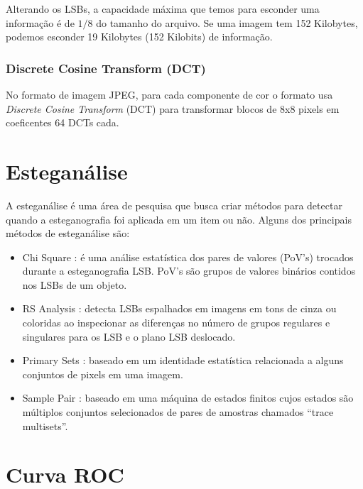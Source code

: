 Alterando os LSBs, a capacidade máxima que temos para esconder uma informação é de $1/8$ do tamanho do arquivo. Se uma imagem tem 152 Kilobytes, podemos esconder 19 Kilobytes (152 Kilobits) de informação.

\subsubsection{Discrete Cosine Transform (DCT)}

No formato de imagem JPEG, para cada componente de cor o formato usa \emph{Discrete Cosine Transform} (DCT) para transformar blocos de 8x8 pixels em coeficentes 64 DCTs cada. \cite{provos_hide_2003}


\section{Esteganálise}

A esteganálise é uma área de pesquisa que busca criar métodos para detectar quando a esteganografia foi aplicada em um item ou não. Alguns dos principais métodos de esteganálise são:

\begin{itemize}
\item Chi Square \cite{westfeld1999attacks}: é uma análise estatística dos pares de valores (PoV's) trocados durante a esteganografia LSB. PoV's são grupos de valores binários contidos nos LSBs de um objeto.
\item RS Analysis \cite{fridrich2001reliable}: detecta LSBs espalhados em imagens em tons de cinza ou coloridas ao inspecionar as diferenças no número de grupos regulares e singulares para os LSB e o plano LSB deslocado.
\item Primary Sets \cite{dumitrescu2002steganalysis}: baseado em um identidade estatística relacionada a alguns conjuntos de pixels em uma imagem.
\item Sample Pair \cite{dumitrescu2003detection}: baseado em uma máquina de estados finitos cujos estados são múltiplos conjuntos selecionados de pares de amostras chamados ``trace multisets''.
\end{itemize}


\section{Curva ROC}


